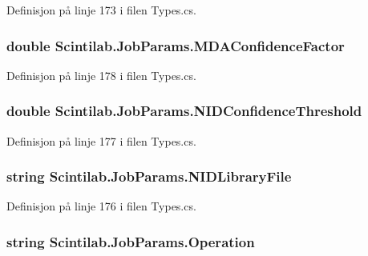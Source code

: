 Definisjon på linje 173 i filen Types.\+cs.

\hypertarget{class_scintilab_1_1_job_params_ad98e65942d6316fe4e5c21da9802fd3a}{
\subsubsection[{M\+D\+A\+Confidence\+Factor}]{\setlength{\rightskip}{0pt plus 5cm}double Scintilab.\+Job\+Params.\+M\+D\+A\+Confidence\+Factor}}\label{class_scintilab_1_1_job_params_ad98e65942d6316fe4e5c21da9802fd3a}


Definisjon på linje 178 i filen Types.\+cs.

\hypertarget{class_scintilab_1_1_job_params_a498964727c90cd03050781cd8eb97e28}{
\subsubsection[{N\+I\+D\+Confidence\+Threshold}]{\setlength{\rightskip}{0pt plus 5cm}double Scintilab.\+Job\+Params.\+N\+I\+D\+Confidence\+Threshold}}\label{class_scintilab_1_1_job_params_a498964727c90cd03050781cd8eb97e28}


Definisjon på linje 177 i filen Types.\+cs.

\hypertarget{class_scintilab_1_1_job_params_a3b26558c0d462457fd091cd109ff2972}{
\subsubsection[{N\+I\+D\+Library\+File}]{\setlength{\rightskip}{0pt plus 5cm}string Scintilab.\+Job\+Params.\+N\+I\+D\+Library\+File}}\label{class_scintilab_1_1_job_params_a3b26558c0d462457fd091cd109ff2972}


Definisjon på linje 176 i filen Types.\+cs.

\hypertarget{class_scintilab_1_1_job_params_af7aa58322a6e62ae3cc3bd5d216d389b}{
\subsubsection[{Operation}]{\setlength{\rightskip}{0pt plus 5cm}string Scintilab.\+Job\+Params.\+Operation}}\label{class_scintilab_1_1_job_params_af7aa58322a6e62ae3cc3bd5d216d389b}


